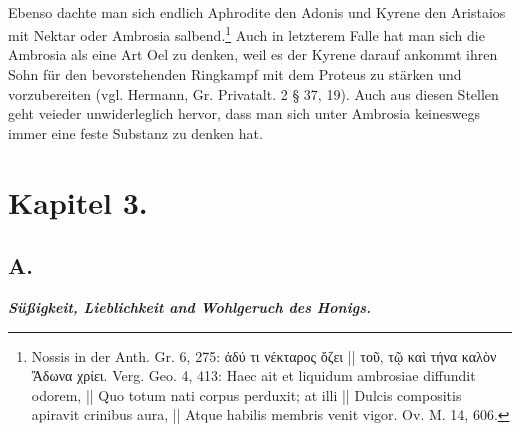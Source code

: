 \documentclass[a4paper, 11pt, oneside]{article}
\begin{document}
\paragraph{}
Ebenso dachte man sich endlich Aphrodite den Adonis und Kyrene den Aristaios mit Nektar oder Ambrosia salbend.\footnote{Nossis in der Anth. Gr. 6, 275: ἀδύ τι νέκταρος ὄζει || τοῦ, τῷ καὶ τήνα καλὸν Ἄδωνα χρίει. Verg. Geo. 4, 413: Haec ait et liquidum ambrosiae diffundit odorem, || Quo totum nati corpus perduxit; at illi || Dulcis compositis apiravit crinibus aura, || Atque habilis membris venit vigor. Ov. M. 14, 606.} Auch in letzterem Falle hat man sich die Ambrosia als eine Art Oel zu denken, weil es der Kyrene darauf ankommt ihren Sohn für den bevorstehenden Ringkampf mit dem Proteus zu stärken und vorzubereiten (vgl. Hermann, Gr. Privatalt. 2
§ 37, 19). Auch aus diesen Stellen geht veieder unwiderleglich hervor, dass man sich unter Ambrosia keineswegs immer eine feste Substanz zu denken hat.
\clearpage
\section{Kapitel 3.}
\subsection{A.}
\begin{center}
\textbf{\emph{Süßigkeit, Lieblichkeit and Wohlgeruch des Honigs.}}
\end{center}
\end{document}
